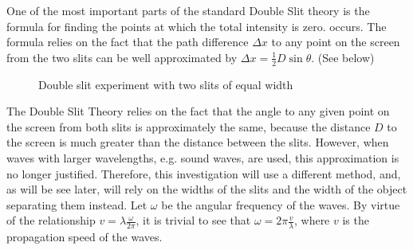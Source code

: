 \documentclass{paper}
\begin{document}
One of the most important parts of the standard Double Slit theory is
the formula for finding the points at which the total intensity is zero.
occurs. The formula relies on the fact that the path difference $\Delta{x}$ to any point on
the screen from the two slits can be well approximated by $\Delta{x} = \frac{1}{2}D\sin{\theta}$. (See  below)

\begin{figure}[H]
    \caption{Double slit experiment with two slits of equal width}
    \label{fig:double-slit-raw}
\end{figure}
The Double Slit Theory relies on the fact that the angle to any given point on the screen from both slits
is approximately the same, because the distance $D$ to the screen is much greater than the distance between
the slits. However, when waves with larger wavelengths, e.g. sound waves, are used, this approximation is no
longer justified. Therefore, this investigation will use a different method, and, as will be see later,
will rely on the widths of the slits and the width of the object separating them instead.
Let $\omega$ be the angular frequency of the waves. By virtue of the relationship $v =                          \lambda\frac{\omega}{2\pi}$,
it is trivial to see that $\omega = 2\pi\frac{v}{\lambda}$, where $v$ is the propagation speed of the waves.
\end{document}

